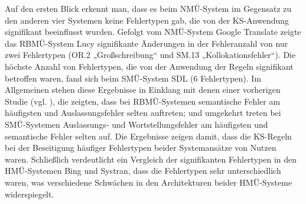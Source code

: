 Auf den ersten Blick erkennt man, dass es beim NMÜ-System im Gegensatz zu den anderen vier Systemen keine Fehlertypen gab, die von der KS-Anwendung signifikant beeinflusst wurden. Gefolgt vom NMÜ-System Google Translate zeigte das RBMÜ-System Lucy signifikante Änderungen in der Fehleranzahl von nur zwei Fehlertypen (OR.2 „Großschreibung“ und SM.13 „Kollokationsfehler“). Die höchste Anzahl von Fehlertypen, die von der Anwendung der Regeln signifikant betroffen waren, fand sich beim SMÜ-System SDL (6 Fehlertypen). Im Allgemeinen stehen diese Ergebnisse in Einklang mit denen einer vorherigen Studie (vgl. \citealt{LommelEtAl2014}), die zeigten, dass bei RBMÜ-Systemen semantische Fehler am häufigsten und Auslassungsfehler selten auftreten; und umgekehrt treten bei SMÜ-Systemen Auslassungs- und Wortstellungsfehler am häufigsten und semantische Fehler selten auf. Die Ergebnisse zeigen damit, dass die KS-Regeln bei der Beseitigung häufiger Fehlertypen beider Systemansätze von Nutzen waren. Schließlich verdeutlicht ein Vergleich der signifikanten Fehlertypen in den HMÜ-Systemen Bing und Systran, dass die Fehlertypen sehr unterschiedlich waren, was verschiedene Schwächen in den Architekturen beider HMÜ-Systeme widerspiegelt.

